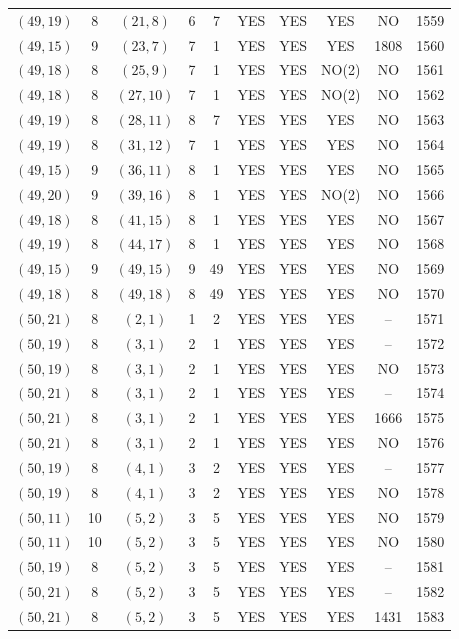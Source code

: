 \begin{longtable}{|c|c|c|c|c|c|c|c|c|c|}
$(49, 19)$ & 8 & $(21, 8)$ & 6 & 7 & YES & YES & YES & NO & 1559\\
$(49, 15)$ & 9 & $(23, 7)$ & 7 & 1 & YES & YES & YES & 1808 & 1560\\
$(49, 18)$ & 8 & $(25, 9)$ & 7 & 1 & YES & YES & NO(2) & NO & 1561\\
$(49, 18)$ & 8 & $(27, 10)$ & 7 & 1 & YES & YES & NO(2) & NO & 1562\\
$(49, 19)$ & 8 & $(28, 11)$ & 8 & 7 & YES & YES & YES & NO & 1563\\
$(49, 19)$ & 8 & $(31, 12)$ & 7 & 1 & YES & YES & YES & NO & 1564\\
$(49, 15)$ & 9 & $(36, 11)$ & 8 & 1 & YES & YES & YES & NO & 1565\\
$(49, 20)$ & 9 & $(39, 16)$ & 8 & 1 & YES & YES & NO(2) & NO & 1566\\
$(49, 18)$ & 8 & $(41, 15)$ & 8 & 1 & YES & YES & YES & NO & 1567\\
$(49, 19)$ & 8 & $(44, 17)$ & 8 & 1 & YES & YES & YES & NO & 1568\\
$(49, 15)$ & 9 & $(49, 15)$ & 9 & 49 & YES & YES & YES & NO & 1569\\
$(49, 18)$ & 8 & $(49, 18)$ & 8 & 49 & YES & YES & YES & NO & 1570\\
$(50, 21)$ & 8 & $(2, 1)$ & 1 & 2 & YES & YES & YES & -- & 1571\\
$(50, 19)$ & 8 & $(3, 1)$ & 2 & 1 & YES & YES & YES & -- & 1572\\
$(50, 19)$ & 8 & $(3, 1)$ & 2 & 1 & YES & YES & YES & NO & 1573\\
$(50, 21)$ & 8 & $(3, 1)$ & 2 & 1 & YES & YES & YES & -- & 1574\\
$(50, 21)$ & 8 & $(3, 1)$ & 2 & 1 & YES & YES & YES & 1666 & 1575\\
$(50, 21)$ & 8 & $(3, 1)$ & 2 & 1 & YES & YES & YES & NO & 1576\\
$(50, 19)$ & 8 & $(4, 1)$ & 3 & 2 & YES & YES & YES & -- & 1577\\
$(50, 19)$ & 8 & $(4, 1)$ & 3 & 2 & YES & YES & YES & NO & 1578\\
$(50, 11)$ & 10 & $(5, 2)$ & 3 & 5 & YES & YES & YES & NO & 1579\\
$(50, 11)$ & 10 & $(5, 2)$ & 3 & 5 & YES & YES & YES & NO & 1580\\
$(50, 19)$ & 8 & $(5, 2)$ & 3 & 5 & YES & YES & YES & -- & 1581\\
$(50, 21)$ & 8 & $(5, 2)$ & 3 & 5 & YES & YES & YES & -- & 1582\\
$(50, 21)$ & 8 & $(5, 2)$ & 3 & 5 & YES & YES & YES & 1431 & 1583\\

\end{longtable}
